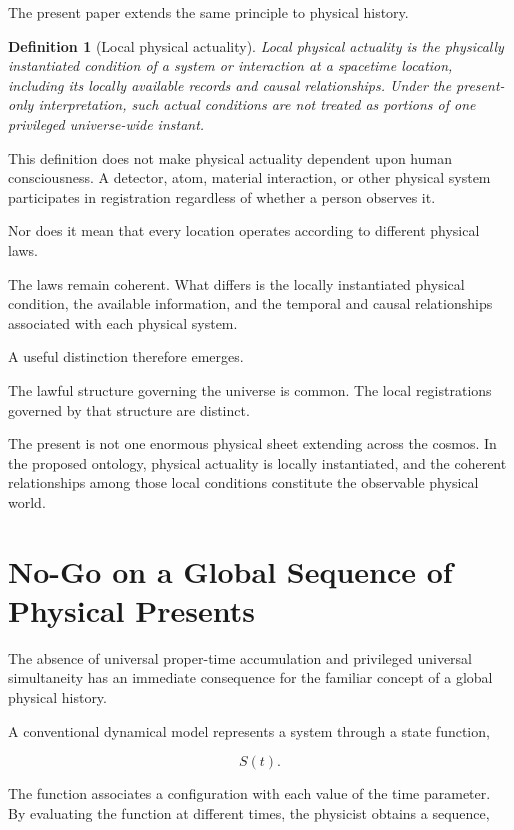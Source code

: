 \documentclass[12pt,onecolumn]{article}
\newtheorem{definition}[proposition]{Definition}
\begin{document}
The present paper extends the same principle to physical history.

\begin{definition}[Local physical actuality]

Local physical actuality is the physically instantiated condition of a system or interaction at a spacetime location, including its locally available records and causal relationships. Under the present-only interpretation, such actual conditions are not treated as portions of one privileged universe-wide instant.

\end{definition}

This definition does not make physical actuality dependent upon human consciousness. A detector, atom, material interaction, or other physical system participates in registration regardless of whether a person observes it.

Nor does it mean that every location operates according to different physical laws.

The laws remain coherent. What differs is the locally instantiated physical condition, the available information, and the temporal and causal relationships associated with each physical system.

A useful distinction therefore emerges.

The lawful structure governing the universe is common. The local registrations governed by that structure are distinct.

The present is not one enormous physical sheet extending across the cosmos. In the proposed ontology, physical actuality is locally instantiated, and the coherent relationships among those local conditions constitute the observable physical world.

\section{No-Go on a Global Sequence of Physical Presents}

The absence of universal proper-time accumulation and privileged universal simultaneity has an immediate consequence for the familiar concept of a global physical history.

A conventional dynamical model represents a system through a state function,

\begin{equation}
S(t).
\end{equation}

The function associates a configuration with each value of the time parameter. By evaluating the function at different times, the physicist obtains a sequence,
\end{document}
